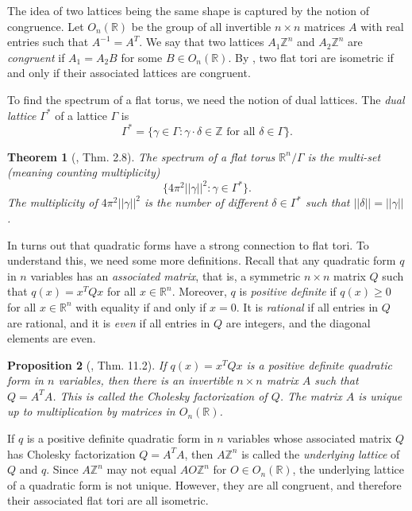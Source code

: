 \documentclass{amsart}
\newtheorem{theorem}{Theorem}[section]
\newtheorem{proposition}[theorem]{Proposition}
\theoremstyle{definition}
\newcommand*{\R}{\mathbb{R}}
\newcommand*{\Z}{\mathbb{Z}}
\begin{document}
The idea of two lattices being the same shape is captured by the notion of congruence. Let $O_n(\R)$ be the group of all invertible $n\times n$ matrices $A$ with real entries such that $A^{-1} = A^T$. We say that two lattices $A_1\Z^n$ and $A_2\Z^n$ are \textit{congruent} if $A_1 = A_2B$ for some $B \in O_n(\R)$. By \cite[p. 5]{berger1971spectre}, two flat tori are isometric if and only if their associated lattices are congruent. 

To find the spectrum of a flat torus, we need the notion of dual lattices. The \textit{dual lattice} $\Gamma^*$ of a lattice $\Gamma$ is 
\begin{equation*}
    \Gamma^* = \{\gamma \in \Gamma : \gamma \cdot \delta \in \Z \text{ for all } \delta \in \Gamma\}.
\end{equation*}
\begin{theorem}[\cite{nilsson2022isospectral}, Thm. 2.8]
    The spectrum of a flat torus $\R^n / \Gamma$ is the multi-set (meaning counting multiplicity) 
    \begin{equation*}
        \{4\pi^2||\gamma||^2 : \gamma \in \Gamma^*\}.
    \end{equation*}
    The multiplicity of $4\pi^2||\gamma||^2$ is the number of different $\delta \in \Gamma^*$ such that $||\delta|| = ||\gamma||$.
\end{theorem}

In turns out that quadratic forms have a strong connection to flat tori. To understand this, we need some more definitions. Recall that any quadratic form $q$ in $n$ variables has an \textit{associated matrix}, that is, a symmetric $n \times n$ matrix $Q$ such that $q(x) = x^TQx$ for all $x \in \R^n$. Moreover, $q$ is \textit{positive definite} if $q(x) \geq 0$ for all $x \in \R^n$ with equality if and only if $x = 0$. %
It is \textit{rational} if all entries in $Q$ are rational, and it is \textit{even} if all entries in $Q$ are integers, and the diagonal elements are even.  

\begin{proposition}[\cite{serre2000matrices}, Thm. 11.2]
    If $q(x) = x^TQx$ is a positive definite quadratic form in $n$ variables, then there is an invertible $n \times n$ matrix $A$ such that $Q = A^TA$. This is called the \textup{Cholesky factorization} of $Q$. The matrix $A$ is unique up to multiplication by matrices in $O_n(\R)$.
\end{proposition}
If $q$ is a positive definite quadratic form in $n$ variables whose associated matrix $Q$ has Cholesky factorization $Q = A^TA$, then $A\Z^n$ is called the \textit{underlying lattice} of $Q$ and $q$. Since $A\Z^n$ may not equal $AO\Z^n$ for $O \in O_n(\R)$, the underlying lattice of a quadratic form is not unique. However, they are all congruent, and therefore their associated flat tori are all isometric.
\end{document}
